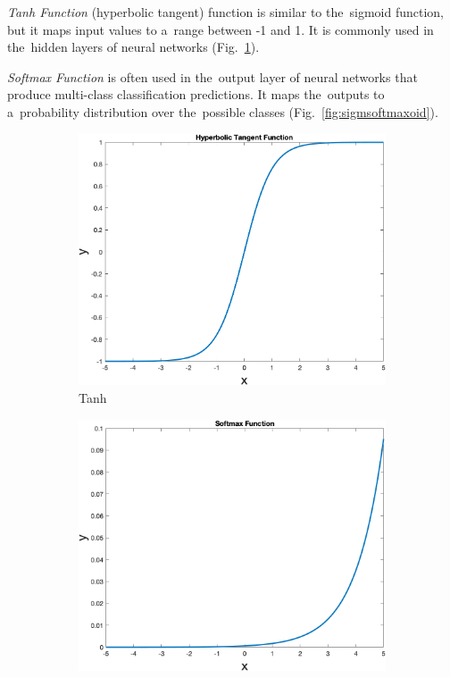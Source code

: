 \emph{Tanh Function} (hyperbolic tangent) function is similar to the~sigmoid function, but it maps input values to a~range between -1 and 1. It is commonly used in the~hidden layers of neural networks (Fig.~\ref{fig:tahn}).

\emph{Softmax Function} is often used in the~output layer of neural networks that produce multi-class classification predictions. It maps the~outputs to a~probability distribution over the~possible classes (Fig.~\ref{fig:sigmsoftmaxoid}).

  \begin{figure}[!ht]
        \centering
        \begin{subfigure}[b]{0.3\textwidth}
            \includegraphics[width=\textwidth]{figures/tanh}
            \caption{Tanh}
            \label{fig:tahn}
        \end{subfigure}
        \hspace{0.1\textwidth}
        \begin{subfigure}[b]{0.3\textwidth}
            \includegraphics[width=\textwidth]{figures/softmax}

\end{subfigure}
\end{figure}
